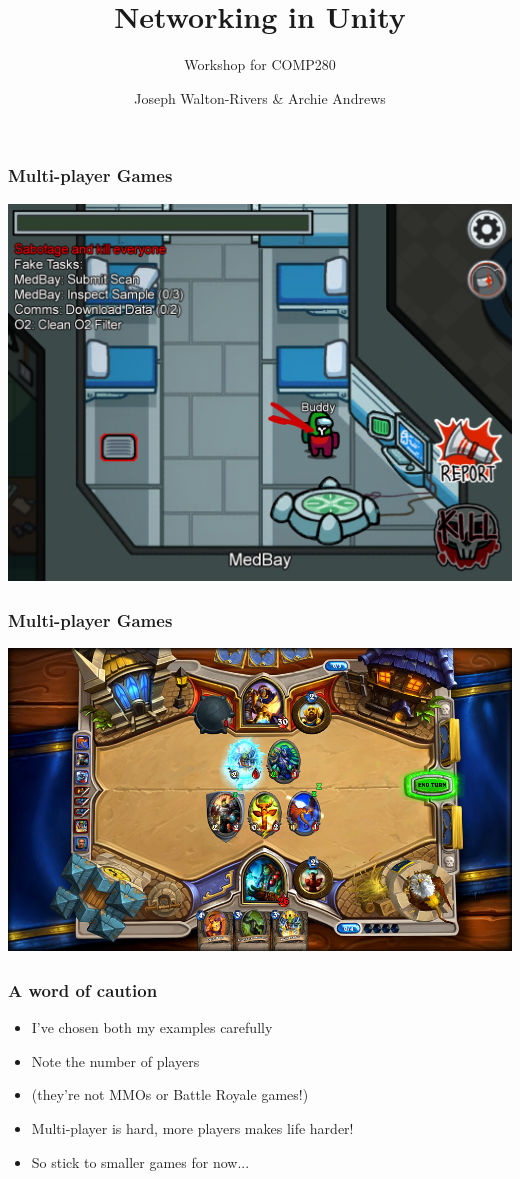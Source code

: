 \documentclass{beamer}
\title{Networking in Unity}
\subtitle{Workshop for COMP280}
\author{Joseph Walton-Rivers \& Archie Andrews}
\begin{document}
	\begin{frame}
		\maketitle
	\end{frame}

	\begin{frame}
		\frametitle{Multi-player Games}
		\includegraphics[width=\textwidth]{game_amungus}
	\end{frame}

	\begin{frame}
		\frametitle{Multi-player Games}
		\includegraphics[width=\textwidth]{game_harthstone}
	\end{frame}

	\begin{frame}
		\frametitle{A word of caution}
		
		\begin{itemize}
			\item I've chosen both my examples carefully
			\item Note the number of players
			\item (they're not MMOs or Battle Royale games!)
			\item Multi-player is hard, more players makes life harder!
			\item So stick to smaller games for now...
		\end{itemize}
		
	\end{frame}
\end{document}
